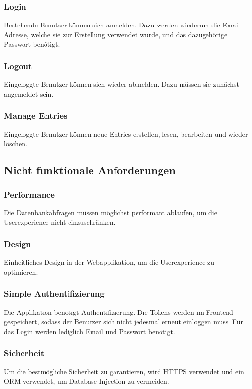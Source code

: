 \documentclass[a4paper, titlepage]{article}
\begin{document}
    \subsubsection{Login}
    Bestehende Benutzer können sich anmelden. Dazu werden wiederum
    die Email-Adresse, welche sie zur Erstellung verwendet wurde,
    und das dazugehörige Passwort benötigt.

    \subsubsection{Logout}
    Eingeloggte Benutzer können sich wieder abmelden. Dazu müssen
    sie zunächst angemeldet sein.

    \subsubsection{Manage Entries}
    Eingeloggte Benutzer können neue Entries erstellen, lesen,
    bearbeiten und wieder löschen.

    \subsection{Nicht funktionale Anforderungen}
    \subsubsection{Performance}
    Die Datenbankabfragen müssen möglichst performant ablaufen, um die
    Userexperience nicht einzuschränken.
    \subsubsection{Design}
    Einheitliches Design in der Webapplikation, um die Userexperience zu
    optimieren.
    \subsubsection{Simple Authentifizierung}
    Die Applikation benötigt Authentifizierung. Die Tokens werden im
    Frontend gespeichert, sodass der Benutzer sich nicht jedesmal erneut
    einloggen muss. Für das Login werden lediglich Email und Passwort
    benötigt.
    \subsubsection{Sicherheit}
    Um die bestmögliche Sicherheit zu garantieren, wird HTTPS verwendet
    und ein ORM verwendet, um Database Injection zu vermeiden.
\end{document}
